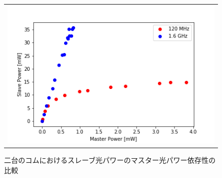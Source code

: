 \documentclass[uplatex, dvipdfmx, a4paper, report, papersize, 11pt]{jsbook}
\begin{document}
\begin{figure}[htpb]
  \centering
    \begin{tabular}{c}




      \begin{minipage}{1\hsize}
        \centering
          \includegraphics[keepaspectratio,  scale=0.7,  angle=0]
                      {figures/chapter4/M-S_power_comparison.png}
                      \caption{二台のコムにおけるスレーブ光パワーのマスター光パワー依存性の比較}
                      \label{M-S_power-comparison}
      \end{minipage}\\


\end{tabular}
\end{figure}
\end{document}
